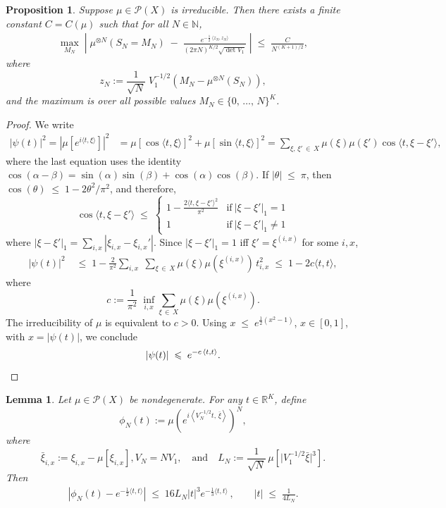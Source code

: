 \documentclass[10pt,a4paper]{article}
\newtheorem{lemm}[theorem]{Lemma}
\newtheorem{prop}[theorem]{Proposition}
\renewcommand{\leq}{\;\leqslant\;}
\newcommand{\scalar}[2]{\langle #1, #2\rangle}
\newcommand{\cP}{\mathcal{P}}
\newcommand{\bbN}{\mathbb{N}}
\newcommand{\bbR}{\mathbb{R}}
\begin{document}
\begin{prop}\label{prop:LCLT}
Suppose $\mu\in\cP(X)$ is irreducible. Then there exists a finite constant $C=C(\mu)$ such that for all $N\in\bbN$,
\begin{align}\label{eq:LCLT}
\max_{M_N}\;
\left |\;\mu^{\otimes N}\left(S_N=M_N\right) \;-\; \frac{e^{-\frac12\,\scalar{z_N}{z_N}}}{(2\pi N) ^{K/2}
\sqrt {\det V_1} }\;
\right| \leq \frac{C}{ N^{(K+1)/2}},
\end{align}
where
\[
z_N:=\frac1{\sqrt N} \;V_1^{-1/2}\left(M_N - \mu^{\otimes N}(S_N)\right),
\]
and the maximum is over all possible values $M_N\in\{0,\,\dots,\,N\}^K$.
\end{prop}

\begin{proof}
We write
\begin{align*}
|\psi(t)|^2 = \left|\mu\left[e^{i\scalar{t}{\xi}}\right]\right|^2 &=\mu\left[\cos\scalar{t}{\xi}\right]^2 + \mu\left[\sin\scalar{t}{\xi}\right]^2 =\sum_{\xi,\,\xi'\,\in\,X}\mu(\xi)\mu(\xi')\cos\scalar{t}{\xi-\xi'},
\end{align*}
where the last equation uses the identity $\cos(\alpha-\beta) = \sin(\alpha)\sin(\beta) + \cos(\alpha)\cos(\beta).$ If $|\theta|\leq \pi$, then $\cos(\theta)\leq 1-2\theta^2/\pi^2$, and therefore,
\begin{equation*}
\cos\scalar{t}{\xi-\xi'} \leq
\begin{cases}
1-\frac{2\scalar{t}{\xi-\xi'}^2}{\pi^2} & \text{if} \ |\xi-\xi'|_1 = 1 \\
1 & \text{if} \ |\xi-\xi'|_1 \neq 1
\end{cases}
\end{equation*}
where $|\xi-\xi'|_1=\sum_{i,x}|\xi_{i,x}-\xi_{i,x}'|$. Since $|\xi-\xi'|_1=1$ iff $\xi'=\xi^{(i,x)}$ for some $i,x$,
\begin{align*}
|\psi(t)|^2 &\leq 1-\frac{2}{\pi^2}\sum_{i,x}\;\sum_{\xi\,\in\,X}\mu(\xi)\mu\left(\xi^{(i,x)}\right)\,t_{i,x}^2
\leq 1-2c\scalar{t}{t},
\end{align*}
where
\[
c:=\frac1{\pi^2} \;\inf_{i,x}\sum_{\xi\,\in\,X}\mu(\xi)\mu\left(\xi^{(i,x)}\right)
.
\]
The irreducibility of $\mu$ is equivalent to $c>0$. Using $x\leq e^{\frac{1}{2}(x^2-1)}$, $x \in [0,1]$, with $x=|\psi(t)|$, we conclude
\begin{equation*}
|\psi(t)|\leq e^{-c\,\scalar{t}{t}}.
\qedhere
\end{equation*}
\end{proof}

\begin{lemm}\label{BerEs}
Let $\mu\in\cP(X)$ be nondegenerate. For any $t\in\bbR^K$, define
\[
\phi_N(t):=\mu\left(e^{i\left\langle V_N^{-1/2}t,\,\bar{\xi}\right\rangle}\right)^N,
\]
where
\[
\bar{\xi}_{i,x}:=\xi_{i,x}-\mu\left[\xi_{i,x}\right], V_N=N V_1,\quad
\text{and}\quad L_N:=\frac1{\sqrt N}\,\mu\left[\big|V_1^{-1/2}\bar{\xi}\big|^3\right].
\]
Then
\begin{align}\label{beres1}
\left|\phi_N(t)-e^{-\frac{1}{2}\scalar{t}{t}}\right|\leq16L_N|t|^3e^{-\frac{1}3\scalar{t}{t}} \,,\qquad |t|\leq \frac{1}{4L_N}.
\end{align}
\end{lemm}
\end{document}
